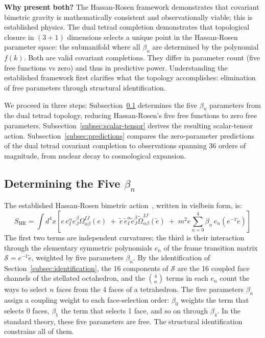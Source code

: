 \documentclass[aps,prd,preprint,superscriptaddress,showpacs,preprintnumbers,amsmath,amssymb,nofootinbib]{revtex4-2}
\begin{document}
\textbf{Why present both?} The Hassan-Rosen framework demonstrates that covariant bimetric gravity is mathematically consistent and observationally viable; this is established physics. The dual tetrad completion demonstrates that topological closure in $(3{+}1)$ dimensions selects a unique point in the Hassan-Rosen parameter space: the submanifold where all $\beta_n$ are determined by the polynomial $f(k)$. Both are valid covariant completions. They differ in parameter count (five free functions vs zero) and thus in predictive power. Understanding the established framework first clarifies what the topology accomplishes: elimination of free parameters through structural identification.

We proceed in three steps: Subsection~\ref{subsec:beta} determines the five $\beta_n$ parameters from the dual tetrad topology, reducing Hassan-Rosen's five free functions to zero free parameters. Subsection~\ref{subsec:scalar-tensor} derives the resulting scalar-tensor action. Subsection~\ref{subsec:predictions} compares the zero-parameter predictions of the dual tetrad covariant completion to observations spanning 36 orders of magnitude, from nuclear decay to cosmological expansion.

\subsection{Determining the Five $\beta_n$}
\label{subsec:beta}

The established Hassan-Rosen bimetric action~\cite{hassan2012}, written in vielbein form, is:
\begin{equation}
S_{\text{HR}} = \int d^4x \left[ e\, e_I^\alpha e_J^\beta \Omega^{IJ}_{\alpha\beta}(e) \;+\; \tilde{e}\, \tilde{e}_I^\alpha \tilde{e}_J^\beta \tilde{\Omega}^{IJ}_{\alpha\beta}(\tilde{e}) \;+\; m^2 e \sum_{n=0}^{4} \beta_n \, e_n(e^{-1}\tilde{e}) \right]
\label{eq:hassan-rosen}
\end{equation}
The first two terms are independent curvatures; the third is their interaction through the elementary symmetric polynomials $e_n$ of the frame transition matrix $\mathcal{S} = e^{-1}\tilde{e}$, weighted by five parameters $\beta_n$. By the identification of Section~\ref{subsec:identification}, the 16 components of $\mathcal{S}$ are the 16 coupled face channels of the stellated octahedron, and the $\binom{4}{n}$ terms in each $e_n$ count the ways to select $n$ faces from the 4 faces of a tetrahedron. The five parameters $\beta_n$ assign a coupling weight to each face-selection order: $\beta_0$ weights the term that selects 0 faces, $\beta_1$ the term that selects 1 face, and so on through $\beta_4$. In the standard theory, these five parameters are free. The structural identification constrains all of them.
\end{document}
